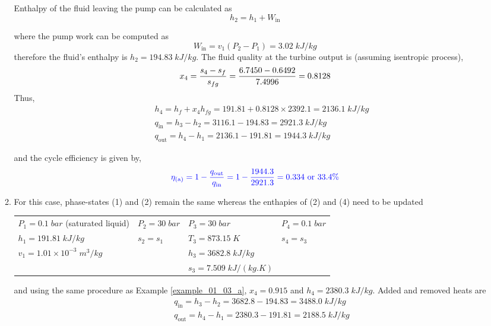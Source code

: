 \begin{enumerate}
\begin{enumerate}
Enthalpy of the fluid leaving the pump can be calculated as
\begin{displaymath}
h_{2}=h_{1}+W_{\text{in}}
\end{displaymath}

where the pump work can be computed as
\begin{displaymath}
W_{\text{in}}=v_{1}\left(P_{2}-P_{1}\right)=3.02\;kJ/kg
\end{displaymath}
therefore the fluid's enthalpy is $h_{2}=194.83\;kJ/kg$. The fluid quality at the turbine output is (assuming isentropic process),
\begin{displaymath}
x_{4}=\displaystyle\frac{s_{4}-s_{f}}{s_{fg}}=\displaystyle\frac{6.7450-0.6492}{7.4996}=0.8128
\end{displaymath}
Thus,
\begin{eqnarray}
&& h_{4}=h_{f}+x_{4}h_{fg}=191.81+0.8128\times 2392.1=2136.1\;kJ/kg \nonumber \\
&& q_{\text{in}}=h_{3}-h_{2}=3116.1-194.83=2921.3\;kJ/kg \nonumber \\
&& q_{\text{out}}=h_{4}-h_{1}=2136.1-191.81=1944.3\;kJ/kg
\end{eqnarray}

and the cycle efficiency is given by,
\begin{displaymath}
\textcolor{blue}{\eta_{\text{(a)}}=1-\displaystyle\frac{q_{\text{out}}}{q_{\text{in}}} = 1 - \displaystyle\frac{1944.3}{2921.3} = 0.334 \text{ or } 33.4\%}
\end{displaymath}

\item \label{example_01_03_b} For this case, phase-states (1) and (2) remain the same whereas the enthapies of (2) and (4) need to be updated

\begin{tabular}{l l l l}
$P_{1}=0.1\;bar$ (saturated liquid) &  $P_{2}=30\;bar$ & $P_{3}=30\;bar$           & $P_{4}=0.1\;bar$ \\
$h_{1}=191.81\;kJ/kg$               &  $s_{2}=s_{1}$   & $T_{3}=873.15\;K$         & $s_{4}=s_{3}$ \\
$v_{1}=1.01\times 10^{-3}\;m^{3}/kg$ &                  & $h_{3}=3682.8\;kJ/kg$     &                 \\
                                    &                 & $s_{3}=7.509\;kJ/(kg.K)$ &                 \\
\end{tabular}

and using the same procedure as Example \ref{example_01_03_a}, $x_{4}=0.915$ and $h_{4}=2380.3\;kJ/kg$. Added and removed heats are
\begin{eqnarray}
&& q_{\text{in}}=h_{3}-h_{2}=3682.8-194.83=3488.0\;kJ/kg \nonumber \\
&& q_{\text{out}}=h_{4}-h_{1}=2380.3-191.81=2188.5\;kJ/kg \nonumber \\
\end{eqnarray}


\end{enumerate}
\end{enumerate}
